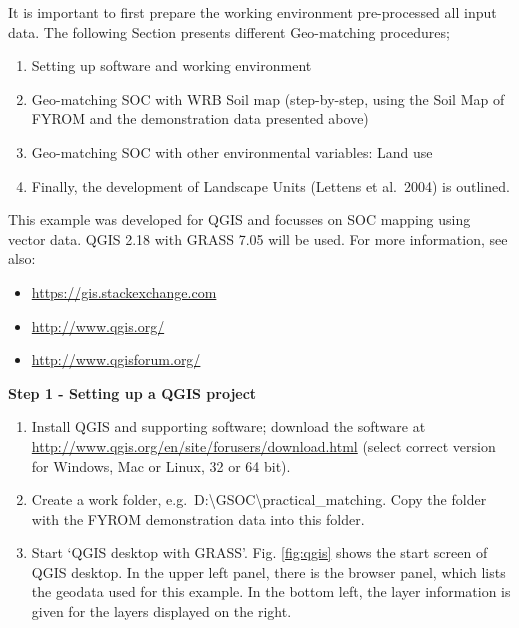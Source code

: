 \documentclass[10pt,b5paper,]{book}
\providecommand{\tightlist}{%
  \setlength{\itemsep}{0pt}\setlength{\parskip}{0pt}}
\theoremstyle{definition}
\theoremstyle{definition}
\theoremstyle{definition}
\theoremstyle{remark}
\begin{document}
It is important to first prepare the working environment pre-processed
all input data. The following Section presents different Geo-matching
procedures;

\begin{enumerate}
\def\labelenumi{\arabic{enumi}.}
\tightlist
\item
  Setting up software and working environment
\item
  Geo-matching SOC with WRB Soil map (step-by-step, using the Soil Map
  of FYROM and the demonstration data presented above)
\item
  Geo-matching SOC with other environmental variables: Land use
\item
  Finally, the development of Landscape Units (Lettens et al.~2004) is
  outlined.
\end{enumerate}

This example was developed for QGIS and focusses on SOC mapping using
vector data. QGIS 2.18 with GRASS 7.05 will be used. For more
information, see also:

\begin{itemize}
\tightlist
\item
  \url{https://gis.stackexchange.com}
\item
  \url{http://www.qgis.org/}
\item
  \url{http://www.qgisforum.org/}
\end{itemize}

\textbf{Step 1 - Setting up a QGIS project}

\begin{enumerate}
\def\labelenumi{\arabic{enumi}.}
\tightlist
\item
  Install QGIS and supporting software; download the software at
  \url{http://www.qgis.org/en/site/forusers/download.html} (select
  correct version for Windows, Mac or Linux, 32 or 64 bit).
\item
  Create a work folder,
  e.g.~D:\textbackslash{}GSOC\textbackslash{}practical\_matching. Copy
  the folder with the FYROM demonstration data into this folder.
\item
  Start `QGIS desktop with GRASS'. Fig. \ref{fig:qgis} shows the start
  screen of QGIS desktop. In the upper left panel, there is the browser
  panel, which lists the geodata used for this example. In the bottom
  left, the layer information is given for the layers displayed on the
  right.
\end{enumerate}
\end{document}
